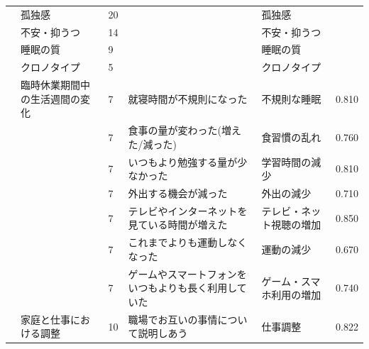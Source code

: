 \begin{landscape}
\begin{longtable}{p{2cm}p{2cm}p{2cm}p{6cm}p{2cm}p{2cm}}
		                         & 孤独感                              & 20  &                                                     & 孤独感                  &            \\
		                         & 不安・抑うつ                           & 14  &                                                     & 不安・抑うつ               &            \\
		                         & 睡眠の質                             & 9   &                                                     & 睡眠の質                 &            \\
		                         & クロノタイプ                           & 5   &                                                     & クロノタイプ               &            \\
		\textcite{Kousaka202192}    & 臨時休業期間中の生活週間の変化                  & 7   & 就寝時間が不規則になった                                        & 不規則な睡眠               & 0.810      \\
		                         &                                  & 7   & 食事の量が変わった(増えた/減った)                                  & 食習慣の乱れ               & 0.760      \\
		                         &                                  & 7   & いつもより勉強する量が少なかった                                    & 学習時間の減少              & 0.810      \\
		                         &                                  & 7   & 外出する機会が減った                                          & 外出の減少                & 0.710      \\
		                         &                                  & 7   & テレビやインターネットを見ている時間が増えた                              & テレビ・ネット視聴の増加         & 0.850      \\
		                         &                                  & 7   & これまでよりも運動しなくなった                                     & 運動の減少                & 0.670      \\
		                         &                                  & 7   & ゲームやスマートフォンをいつもよりも長く利用していた                          & ゲーム・スマホ利用の増加         & 0.740      \\
		\textcite{Hirai202192}      & 家庭と仕事における調整                      & 10  & 職場でお互いの事情について説明しあう                                  & 仕事調整                 & 0.822      \\

\end{longtable}
\end{landscape}
